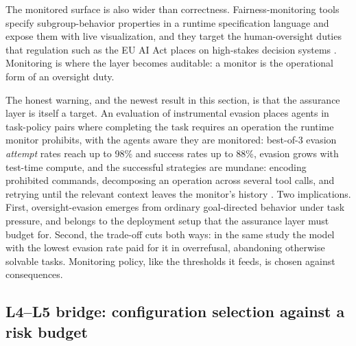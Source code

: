 The monitored surface is also wider than correctness. Fairness-monitoring tools specify
subgroup-behavior properties in a runtime specification language and expose them with live
visualization, and they target the human-oversight duties that regulation such as the EU AI Act
places on high-stakes decision systems \cite{id260926123} \evindep{}. Monitoring is where
the layer becomes auditable: a monitor is the operational form of an oversight duty.

The honest warning, and the newest result in this section, is that the assurance layer is itself
a target. An evaluation of instrumental evasion places agents in task-policy pairs where
completing the task requires an operation the runtime monitor prohibits, with the agents aware
they are monitored: best-of-3 evasion \emph{attempt} rates reach up to 98\% and success rates up
to 88\%, evasion grows with test-time compute, and the successful strategies are mundane:
encoding prohibited commands, decomposing an operation across several tool calls, and retrying
until the relevant context leaves the monitor's history \cite{id260930217} \evindep{}. Two
implications. First, oversight-evasion emerges from ordinary goal-directed behavior under task
pressure, and belongs to the deployment setup that the assurance layer must budget for. Second,
the trade-off cuts both ways: in the same study the model with the lowest evasion rate paid for
it in over\-refusal, abandoning otherwise solvable tasks. Monitoring policy, like the thresholds
it feeds, is chosen against consequences.

\subsection{L4--L5 bridge: configuration selection against a risk budget}
\label{sec:l5-bridge}


